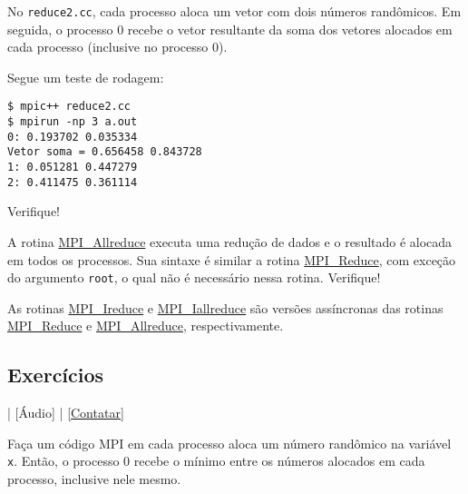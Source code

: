 \begin{ex}
  No \verb+reduce2.cc+, cada processo aloca um vetor com dois números randômicos. Em seguida, o processo $0$ recebe o vetor resultante da soma dos vetores alocados em cada processo (inclusive no processo 0).

  

  Segue um teste de rodagem:
\begin{verbatim}
$ mpic++ reduce2.cc
$ mpirun -np 3 a.out 
0: 0.193702 0.035334
Vetor soma = 0.656458 0.843728
1: 0.051281 0.447279
2: 0.411475 0.361114
\end{verbatim}
  Verifique!
\end{ex}

\begin{obs}
  A rotina \href{https://www.open-mpi.org/doc/current/man3/MPI\_Allreduce.3.php}{MPI\_Allreduce} executa uma redução de dados e o resultado é alocada em todos os processos. Sua sintaxe é similar a rotina \href{https://www.open-mpi.org/doc/current/man3/MPI_Reduce.3.php}{MPI\_Reduce}, com exceção do argumento \verb+root+, o qual não é necessário nessa rotina. Verifique!
\end{obs}

\begin{obs}
  As rotinas \href{https://www.open-mpi.org/doc/current/man3/MPI\_Ireduce.3.php}{MPI\_Ireduce} e \href{https://www.open-mpi.org/doc/current/man3/MPI\_Iallreduce.3.php}{MPI\_Iallreduce} são versões assíncronas das rotinas \href{https://www.open-mpi.org/doc/current/man3/MPI_Reduce.3.php}{MPI\_Reduce} e \href{https://www.open-mpi.org/doc/current/man3/MPI\_Allreduce.3.php}{MPI\_Allreduce}, respectivamente.
\end{obs}

\subsection* {Exercícios}

\begin{flushright}
  [Vídeo] | [Áudio] | \href{https://phkonzen.github.io/notas/contato.html}{[Contatar]}
\end{flushright}

\begin{exer}
  Faça um código MPI em cada processo aloca um número randômico na variável \verb+x+. Então, o processo 0 recebe o mínimo entre os números alocados em cada processo, inclusive nele mesmo.
\end{exer}

